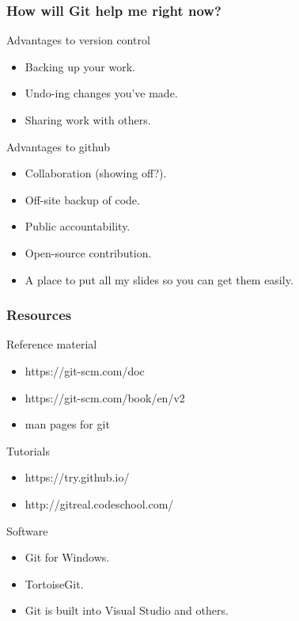 \documentclass{beamer}
\begin{document}
\begin{frame}
  \frametitle{How will Git help me right now?}

  \begin{block}{Advantages to version control}
    \begin{itemize}  
      \item Backing up your work.
      \item Undo-ing changes you've made.
      \item Sharing work with others.
    \end{itemize}
  \end{block}

  \begin{block}{Advantages to github}
    \begin{itemize}  
      \item Collaboration (showing off?).
      \item Off-site backup of code.
      \item Public accountability.
      \item Open-source contribution.
      \item A place to put all my slides so you can get them easily.
    \end{itemize}
  \end{block}

\end{frame}

\begin{frame}
  \frametitle{Resources}

  \begin{block}{Reference material}
    \begin{itemize}
      \item https://git-scm.com/doc
      \item https://git-scm.com/book/en/v2
      \item man pages for git
    \end{itemize}
  \end{block}

  \begin{block}{Tutorials}
    \begin{itemize}  
      \item https://try.github.io/
      \item http://gitreal.codeschool.com/
    \end{itemize}
  \end{block}

  \begin{block}{Software}
   \begin{itemize}  
      \item Git for Windows.
      \item TortoiseGit.
      \item Git is built into Visual Studio and others.
    \end{itemize}

  \end{block}
\end{frame}
\end{document}
